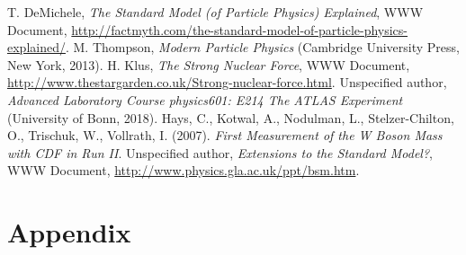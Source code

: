 \documentclass[twocolumn]{article}
\begin{document}
\begin{thebibliography}{9}
T. DeMichele, \textit{The Standard Model (of Particle Physics) Explained}, WWW Document, \url{http://factmyth.com/the-standard-model-of-particle-physics-explained/}.
M. Thompson, \textsl{Modern Particle Physics} (Cambridge University Press, New York, 2013).
H. Klus, \textit{The Strong Nuclear Force}, WWW Document, \url{http://www.thestargarden.co.uk/Strong-nuclear-force.html}.
Unspecified author, \textsl{Advanced Laboratory Course physics601: E214 The ATLAS Experiment} (University of Bonn, 2018).
Hays, C., Kotwal, A., Nodulman, L., Stelzer-Chilton, O., Trischuk, W., Vollrath, I. (2007). \textsl{First Measurement of the W Boson Mass with CDF in Run II}.
Unspecified author, \textsl{Extensions to the Standard Model?}, WWW Document, \url{http://www.physics.gla.ac.uk/ppt/bsm.htm}.
\end{thebibliography}
\newpage
\onecolumn
\section{Appendix}
\end{document}
